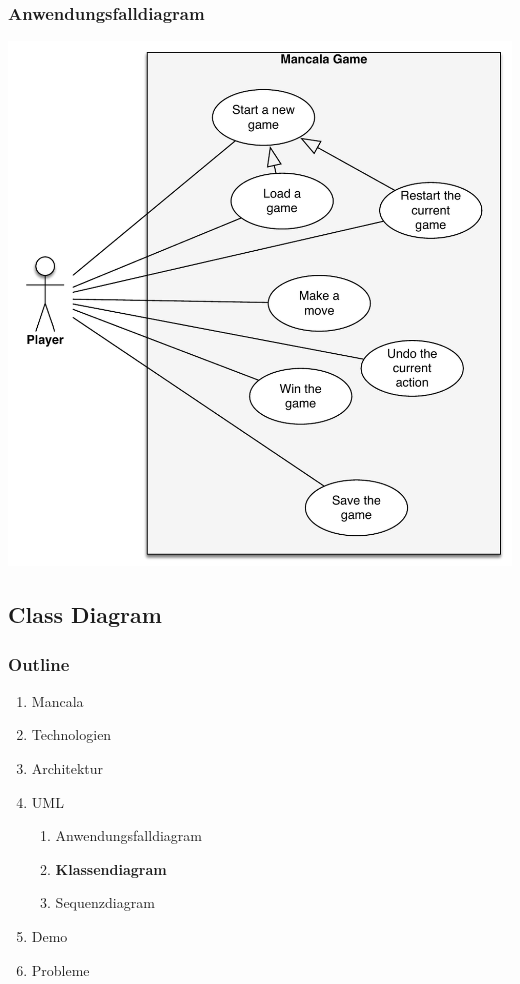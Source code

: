 \documentclass[
	10pt,
	t		%
]{beamer}
\begin{document}
\begin{frame}
\frametitle{Anwendungsfalldiagram}
\begin{center}
\includegraphics[scale=0.32]{./../Diagrams/UseCases.pdf}
\end{center}
\end{frame}

\subsection{Class Diagram}
\begin{frame}
\frametitle{Outline}
\begin{enumerate}
\item Mancala
\item Technologien
\item Architektur
\item UML
\begin{enumerate}
\item Anwendungsfalldiagram
\item \textbf{Klassendiagram}
\item Sequenzdiagram
\end{enumerate}
\item Demo
\item Probleme
\end{enumerate}
\end{frame}
\end{document}
